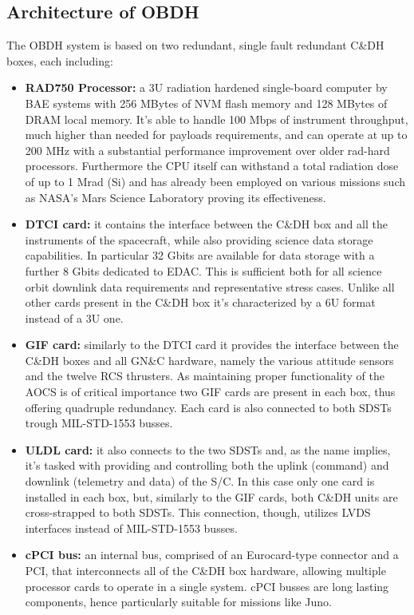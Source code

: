 \subsection{Architecture of OBDH}
\label{subsec:OBDH_architecture}

The OBDH system is based on two redundant, single fault redundant C\&DH boxes, each including:
\begin{itemize}
    \item \textbf{RAD750 Processor:} a 3U radiation hardened single-board computer by BAE systems \cite{C&DH_power} with 256 MBytes of NVM flash memory and 128 MBytes of DRAM local memory. \cite{juno_sito} It's able to handle 100 Mbps of instrument throughput, much higher than needed for payloads requirements, and can operate at up to 200 MHz with a substantial performance improvement over older rad-hard processors. Furthermore the CPU itself can withstand a total radiation dose of up to 1 Mrad (Si) and has already been employed on various missions such as NASA's Mars Science Laboratory proving its effectiveness. \cite{RAD750} \cite{batterie}
    \item \textbf{DTCI card:} it contains the interface between the C\&DH box and all the instruments of the spacecraft, while also providing science data storage capabilities. In particular 32 Gbits are available for data storage with a further 8 Gbits dedicated to EDAC. This is sufficient both for all science orbit downlink data requirements and representative stress cases. Unlike all other cards present in the C\&DH box it's characterized by a 6U format instead of a 3U one. \cite{juno_sito}
    \item \textbf{GIF card:} similarly to the DTCI card it provides the interface between the C\&DH boxes and all GN\&C hardware, namely the various attitude sensors and the twelve RCS thrusters. As maintaining proper functionality of the AOCS is of critical importance two GIF cards are present in each box, thus offering quadruple redundancy. Each card is also connected to both SDSTs trough MIL-STD-1553 \cite{MIL-STD-1553} busses. \cite{juno_telecommunication}   
    \item \textbf{ULDL card:} it also connects to the two SDSTs and, as the name implies, it's tasked with providing and controlling both the uplink (command) and downlink (telemetry and data) of the S/C. In this case only one card is installed in each box, but, similarly to the GIF cards, both C\&DH units are cross-strapped to both SDSTs. This connection, though, utilizes LVDS interfaces instead of MIL-STD-1553 busses. \cite{juno_telecommunication}  
    \item \textbf{cPCI bus:} an internal bus, comprised of an Eurocard-type connector and a PCI, that interconnects all of the C\&DH box hardware, allowing multiple processor cards to operate in a single system. cPCI busses are long lasting components, hence particularly suitable for missions like Juno.
    



    
\end{itemize}
